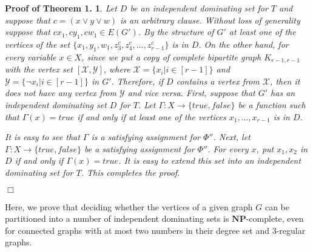 \documentclass[
final
]{dmtcs-episciences}
\newtheorem{preali}{{\bf Proof of Theorem 1.}}
\newenvironment{ali}[1]{\begin{preali}{\rm
			#1}\hfill{$\Box$}}{\end{preali}}
\begin{document}
\begin{ali}
{		Let $D$ be an independent dominating set for $T$ and
		suppose that $c=(x \vee y \vee w)$ is an arbitrary clause. Without loss of generality suppose that $cx_1,cy_1,cw_1\in E(G')$. By the structure of $G'$ at least one of the vertices of the set $\{x_1,y_1,w_1,z^{c}_3, z^{c}_4, \ldots, z^{c}_{r-1} \}$ is in $D$. On the other hand, for every variable $x\in X$, since we put a copy of complete bipartite graph $K_{r-1,r-1}$ with the vertex set $[\mathcal{X}, \mathcal{Y}]$, where $\mathcal{X}=\{x_i | i\in [r-1]\}$ and $\mathcal{Y}=\{\neg x_i | i\in [r-1]\}$ in $G'$.
		Therefore, if $D$ contains a vertex from  $\mathcal{X}$, then it does not have any vertex from $\mathcal{Y}$ and vice versa.
		First, suppose that $G'$ has an independent dominating set $D$ for $T$.
		Let $\Gamma : X \rightarrow \{true,false \} $ be a function such that $\Gamma(x)=true$ if and only if at least one of the vertices $x_1,\ldots, x_{r-1}$ is in $ D$.
		
		
		It is easy to see that
		$\Gamma$ is a   satisfying assignment for $\Phi''$. Next, let  $\Gamma : X \rightarrow \{ true,false\} $ be
		a   satisfying assignment for $\Phi''$. For every $x$, put $x_1, x_{2}$  in $D$ if and only if $\Gamma(x)=true$. It is easy to extend this set into an independent dominating set for $T$. This completes the proof.
}\end{ali}


Here, we prove that deciding whether the vertices of a given  graph $G$ can be partitioned into a number of  independent dominating sets is  $ \mathbf{NP} $-complete, even for connected graphs with at most two numbers in their degree set and  3-regular graphs.
\end{document}
